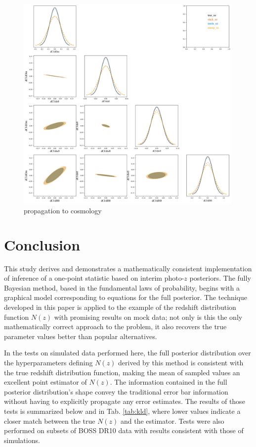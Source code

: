 \begin{figure}
	\begin{center}
		\includegraphics[width=0.99\textwidth]{figures/chippr/final_plot.png}
		\caption{propagation to cosmology}
	\end{center}
\end{figure}

\section{Conclusion}

This study derives and demonstrates a mathematically consistent implementation of inference of a one-point statistic based on interim photo-$z$ posteriors.  
The fully Bayesian method, based in the fundamental laws of probability, begins with a graphical model corresponding to equations for the full posterior.  
The technique developed in this paper is applied to the example of the redshift distribution function $N(z)$ with promising results on mock data; not only is this the only mathematically correct approach to the problem, it also recovers the true parameter values better than popular alternatives.  

In the tests on simulated data performed here, the full posterior distribution over the hyperparameters defining $N(z)$ derived by this method is consistent with the true redshift distribution function, making the mean of sampled values an excellent point estimator of $N(z)$.  
The information contained in the full posterior distribution's shape convey the traditional error bar information without having to explicitly propagate any error estimates.  
The results of those tests is summarized below and in Tab. \ref{tab:kld}, where lower values indicate a closer match between the true $N(z)$ and the estimator.  
Tests were also performed on subsets of BOSS DR10 data with results consistent with those of simulations.

